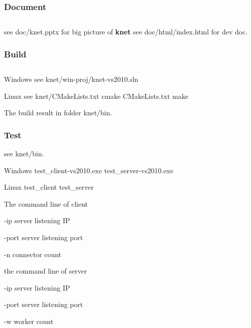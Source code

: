 \subsubsection*{Document}

\subsection*{}

see {\ttfamily doc/knet.\+pptx} for big picture of {\bfseries knet} see {\ttfamily doc/html/index.\+html} for dev doc.

\subsubsection*{Build}

\subsection*{}


\begin{DoxyEnumerate}
\item Windows see {\ttfamily knet/win-\/proj/knet-\/vs2010.\+sln}
\item Linux see {\ttfamily knet/\+C\+Make\+Lists.\+txt} {\ttfamily cmake C\+Make\+Lists.\+txt} {\ttfamily make}
\end{DoxyEnumerate}

The build result in folder {\ttfamily knet/bin}.

\subsubsection*{Test}

see {\ttfamily knet/bin}.


\begin{DoxyEnumerate}
\item Windows {\ttfamily test\+\_\+client-\/vs2010.\+exe} {\ttfamily test\+\_\+server-\/vs2010.\+exe}
\item Linux {\ttfamily test\+\_\+client} {\ttfamily test\+\_\+server}
\item The command line of client
\begin{DoxyEnumerate}
\item {\ttfamily -\/ip} server listening I\+P
\item {\ttfamily -\/port} server listening port
\item {\ttfamily -\/n} connector count
\end{DoxyEnumerate}
\item the command line of server
\begin{DoxyEnumerate}
\item {\ttfamily -\/ip} server listening I\+P
\item {\ttfamily -\/port} server listening port
\item {\ttfamily -\/w} worker count 
\end{DoxyEnumerate}
\end{DoxyEnumerate}